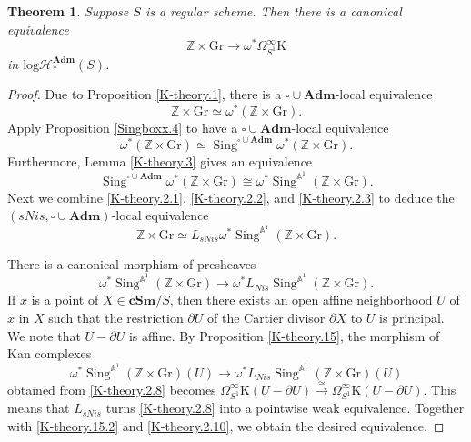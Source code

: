 \documentclass[11pt, a4paper]{amsart}
\newtheorem{thm}{Theorem}[subsection]
\theoremstyle{definition}
\numberwithin{equation}{subsection}
\newcommand{\Z}{\mathbb{Z}}
\newcommand{\A}{\mathbb{A}}
\newcommand{\cSm}{\mathbf{cSm}}
\newcommand{\Sing}{\operatorname{Sing}}              %
\newcommand{\Gr}{{\mathrm{Gr}}}
\newcommand{\Adm}{\mathbf{Adm}}
\newcommand{\Kth}{\mathrm{K}}
\newcommand{\boxx}{\square}
\newcommand{\inflogHptAdm}{\mathrm{log}\mathcal{H}_{\ast}^\Adm}
\begin{document}
\begin{thm}
\label{K-theory.2}
Suppose $S$ is a regular scheme.
Then there is a canonical equivalence
\begin{equation}
\label{K-theory.2.9}
\Z\times \Gr
\to
\omega^*\Omega_{S^1}^\infty \Kth
\end{equation}
in $\inflogHptAdm(S)$.
\end{thm}
\begin{proof}
Due to Proposition \ref{K-theory.1}, there is a $\boxx\cup\Adm$-local  equivalence 
\begin{equation}
\label{K-theory.2.1}
\Z\times \Gr
\simeq
\omega^*(\Z\times \Gr).
\end{equation}
Apply Proposition \ref{Singboxx.4} to have a $\boxx\cup\Adm$-local  equivalence 
\begin{equation}
\label{K-theory.2.2}
\omega^*(\Z\times \Gr)
\simeq
\Sing^{\boxx\cup\Adm} \omega^*(\Z \times  \Gr).
\end{equation}
Furthermore, 
Lemma \ref{K-theory.3} gives an equivalence
\begin{equation}
\label{K-theory.2.3}
\Sing^{\boxx\cup\Adm} \omega^*(\Z \times  \Gr)
\cong
\omega^* \Sing^{\A^1}(\Z \times \Gr).
\end{equation}
Next we combine \eqref{K-theory.2.1}, \eqref{K-theory.2.2}, and \eqref{K-theory.2.3} 
to deduce the $(sNis,\boxx\cup\Adm)$-local  equivalence
\begin{equation}
\label{K-theory.2.10}
\Z\times \Gr
\simeq
L_{sNis}\omega^*\Sing^{\A^1}(\Z\times \Gr).
\end{equation}

There is a canonical morphism of  presheaves
\begin{equation}
\label{K-theory.2.8}
\omega^* \Sing^{\A^1}(\Z\times \Gr)
\to
\omega^* L_{Nis}\Sing^{\A^1}(\Z\times \Gr).
\end{equation}
If $x$ is a point of $X\in \cSm/S$,
then there exists an open affine neighborhood $U$ of $x$ in $X$ such that the restriction $\partial U$ 
of the Cartier divisor $\partial X$ to $U$ is principal.
We note that $U-\partial U$ is affine.
By Proposition \ref{K-theory.15}, the morphism of Kan complexes
\[
\omega^* \Sing^{\A^1}(\Z\times \Gr)(U)
\to
\omega^* L_{Nis}\Sing^{\A^1}(\Z\times \Gr)(U)
\]
obtained from \eqref{K-theory.2.8} becomes $\Omega_{S^1}^\infty \Kth(U-\partial U)\xrightarrow{\simeq} \Omega_{S^1}^\infty \Kth(U-\partial U)$.
This means that $L_{sNis}$ turns \eqref{K-theory.2.8} into a pointwise weak equivalence.
Together with \eqref{K-theory.15.2} and \eqref{K-theory.2.10}, we obtain the desired equivalence.
\end{proof}
\end{document}

